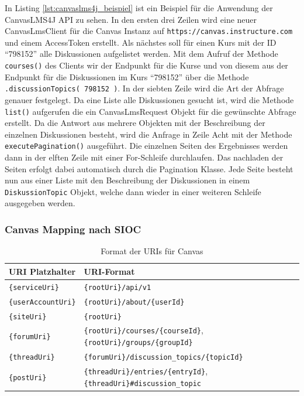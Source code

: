 In Listing \ref{lst:canvaslms4j_beispiel} ist ein Beispiel für die Anwendung der CanvasLMS4J API zu sehen. In den ersten drei Zeilen wird eine neuer CanvasLmsClient für die Canvas Instanz auf \texttt{https://canvas.instructure.com} und einem AccessToken erstellt. Als nächstes soll für einen Kurs mit der ID \enquote{798152} alle Diskussionen aufgelistet werden. Mit dem Aufruf der Methode \texttt{courses()} des Clients wir der Endpunkt für die Kurse und von diesem aus der Endpunkt für die Diskussionen im Kurs \enquote{798152} über die Methode \texttt{.discussionTopics( 798152 )}. In der siebten Zeile wird die Art der Abfrage genauer festgelegt. Da eine Liste alle Diskussionen gesucht ist, wird die Methode \texttt{list()} aufgerufen die ein CanvasLmsRequest Objekt für die gewünschte Abfrage erstellt. Da die Antwort aus mehrere Objekten mit der Beschreibung der einzelnen Diskussionen besteht, wird die Anfrage in Zeile Acht mit der Methode \texttt{executePagination()} ausgeführt. Die einzelnen Seiten des Ergebnisses werden dann in der elften Zeile mit einer For-Schleife durchlaufen. Das nachladen der Seiten erfolgt dabei automatisch durch die Pagination Klasse. Jede Seite besteht nun aus einer Liste mit den Beschreibung der Diskussionen in einem \texttt{DiskussionTopic} Objekt, welche dann wieder in einer weiteren Schleife ausgegeben werden.


\subsubsection{Canvas Mapping nach SIOC} %
\label{ssub:canvas_sioc_mapping}

\begin{table}[h]
    \centering
    \caption{Format der URIs für Canvas}
    \begin{tabular}{l|p{11cm}}
        \textbf{URI Platzhalter} & URI-Format \\ 
        \hline
        \texttt{\{serviceUri\}} & 
        \texttt{\{rootUri\}/api/v1} \\

        \texttt{\{userAccountUri\}} & 
        \texttt{\{rootUri\}/about/\{userId\}} \\

        \texttt{\{siteUri\}} & 
        \texttt{\{rootUri\}} \\

        \texttt{\{forumUri\}} & 
        \texttt{\{rootUri\}/courses/\{courseId\}},
        \texttt{\{rootUri\}/groups/\{groupId\}} \\

        \texttt{\{threadUri\}} & 
        \texttt{\{forumUri\}/discussion\_topics/\{topicId\}} \\

        \texttt{\{postUri\}} & 
        \texttt{\{threadUri\}/entries/\{entryId\}},
        \texttt{\{threadUri\}\#discussion\_topic} \\
    \end{tabular}
    \label{tbl:canvas_uri_platzhalter}
\end{table}

